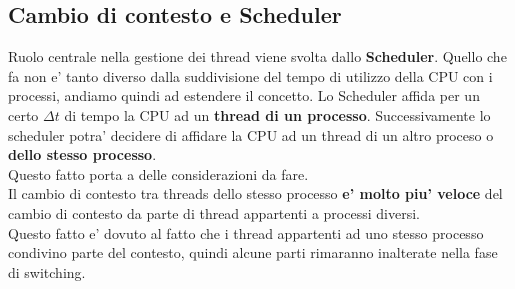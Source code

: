 \documentclass{article}
\begin{document}
    \subsection{Cambio di contesto e Scheduler}
    Ruolo centrale nella gestione dei thread viene svolta dallo
    \textbf{Scheduler}.
    Quello che fa non e' tanto diverso dalla suddivisione del tempo di 
    utilizzo della CPU con i processi, andiamo quindi ad estendere il
    concetto.
    Lo Scheduler affida per un certo \( \Delta t \) di tempo la CPU
    ad un \textbf{thread di un processo}.
    Successivamente lo scheduler potra' decidere di affidare la CPU
    ad un thread di un altro proceso o \textbf{dello stesso processo}.
    \\
    Questo fatto porta a delle considerazioni da fare.
    \\
    Il cambio di contesto tra threads dello stesso processo \textbf{e'
    molto piu' veloce} del cambio di contesto da parte di thread 
    appartenti a processi diversi.
    \\
    Questo fatto e' dovuto al fatto che i thread appartenti ad uno stesso
    processo condivino parte del contesto, quindi alcune parti rimaranno
    inalterate nella fase di switching.
\end{document}
